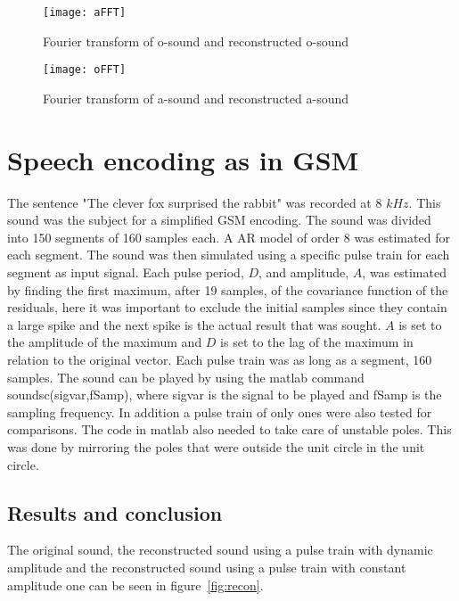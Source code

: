 \documentclass[10pt]{article}
\begin{document}
\begin{figure}[!hp]

    \begin{center}
      \texttt{[image: aFFT]}
    \caption{Fourier transform of o-sound and reconstructed o-sound \label{fig:ffto}}
    \end{center}

\end{figure}

\begin{figure}[!hp]

    \begin{center}
      \texttt{[image: oFFT]}
    \caption{Fourier transform of a-sound and reconstructed a-sound \label{fig:ffta}}
    \end{center}

\end{figure}

\clearpage


\section{Speech encoding as in GSM}
The sentence "The clever fox surprised the rabbit" was recorded at
8 $kHz$. This sound was the subject for a simplified GSM encoding.
The sound was divided into 150 segments of 160 samples each. A
AR model of order 8 was estimated for each segment. The sound was
then simulated using a specific pulse train for each segment as
input signal. Each pulse period, $D$, and amplitude, $A$, was
estimated by finding the first maximum, after 19 samples, of
the covariance function of the residuals, here it was important to
exclude the initial samples since they contain a large spike and the
next spike is the actual result that was sought. $A$ is set to the
amplitude of the maximum and $D$ is set to the lag of the maximum
in relation to the original vector. Each pulse train was as long as a
segment, 160 samples. The sound can be played by using the matlab command
soundsc(sigvar,fSamp), where sigvar is the signal to be played and fSamp
is the sampling frequency. In addition a pulse train of only ones were
also tested for comparisons. The code in matlab also needed to take
care of unstable poles. This was done by mirroring the poles that were
outside the unit circle in the unit circle.



\subsection{Results and conclusion}
The original sound, the reconstructed sound using a pulse train with
dynamic amplitude and the reconstructed sound using a pulse train
with constant amplitude one can be seen in figure~\ref{fig:recon}.
\end{document}
